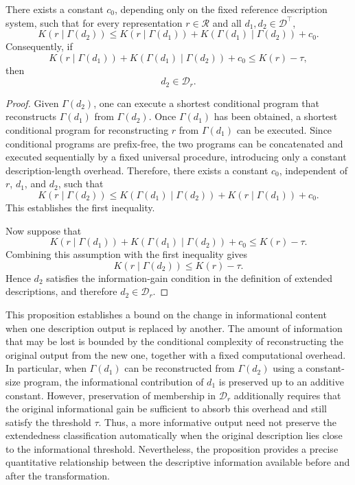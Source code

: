 \begin{proposition}
\label{prop:extended_description_monotonicity}
There exists a constant $c_0$, depending only on the fixed reference description system, such that for every representation $r\in\mathcal{R}$ and all $d_1,d_2\in\mathcal{D}^\top$,
\[
K(r\mid\Gamma(d_2)) \leq K(r\mid\Gamma(d_1))
+ K(\Gamma(d_1)\mid\Gamma(d_2)) + c_0.
\]
Consequently, if
\[
K(r\mid\Gamma(d_1)) + K(\Gamma(d_1)\mid\Gamma(d_2)) + c_0
\leq K(r)-\tau,
\]
then
\[
d_2\in\mathcal{D}_r.
\]
\end{proposition}
\begin{proof}
Given $\Gamma(d_2)$, one can execute a shortest conditional program that reconstructs $\Gamma(d_1)$ from $\Gamma(d_2)$. Once $\Gamma(d_1)$ has been obtained, a shortest conditional program for reconstructing $r$ from $\Gamma(d_1)$ can be executed. Since conditional programs are prefix-free, the two programs can be concatenated and executed sequentially by a fixed universal procedure, introducing only a constant description-length overhead. Therefore, there exists a constant $c_0$, independent of $r$, $d_1$, and $d_2$, such that
\[
K(r\mid\Gamma(d_2)) \leq K(\Gamma(d_1)\mid\Gamma(d_2)) +
K(r\mid\Gamma(d_1)) + c_0.
\]
This establishes the first inequality.

Now suppose that
\[
K(r\mid\Gamma(d_1)) + K(\Gamma(d_1)\mid\Gamma(d_2)) + c_0
\leq K(r)-\tau.
\]
Combining this assumption with the first inequality gives
\[
K(r\mid\Gamma(d_2)) \leq K(r)-\tau.
\]
Hence $d_2$ satisfies the information-gain condition in the definition of extended descriptions, and therefore $d_2\in\mathcal{D}_r$.
\end{proof}

This proposition establishes a bound on the change in informational content when one description output is replaced by another. The amount of information that may be lost is bounded by the conditional complexity of reconstructing the original output from the new one, together with a fixed computational overhead. In particular, when $\Gamma(d_1)$ can be reconstructed from $\Gamma(d_2)$ using a constant-size program, the informational contribution of $d_1$ is preserved up to an additive constant. However, preservation of membership in $\mathcal{D}_r$ additionally requires that the original informational gain be sufficient to absorb this overhead and still satisfy the threshold $\tau$. Thus, a more informative output need not preserve the extendedness classification automatically when the original description lies close to the informational threshold. Nevertheless, the proposition provides a precise quantitative relationship between the descriptive information available before and after the transformation.


